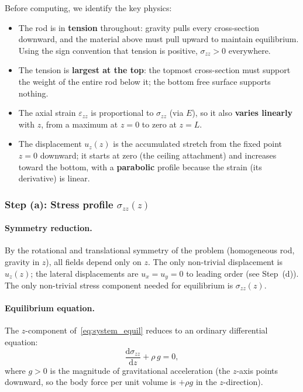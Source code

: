 Before computing, we identify the key physics:

\begin{itemize}
    \item The rod is in \textbf{tension} throughout: gravity pulls every cross-section downward, and the material above must pull upward to maintain equilibrium. Using the sign convention that tension is positive, $\sigma_{zz} > 0$ everywhere.
    \item The tension is \textbf{largest at the top}: the topmost cross-section must support the weight of the entire rod below it; the bottom free surface supports nothing.
    \item The axial strain $\varepsilon_{zz}$ is proportional to $\sigma_{zz}$ (via $E$), so it also \textbf{varies linearly} with $z$, from a maximum at $z=0$ to zero at $z=L$.
    \item The displacement $u_z(z)$ is the accumulated stretch from the fixed point $z=0$ downward; it starts at zero (the ceiling attachment) and increases toward the bottom, with a \textbf{parabolic} profile because the strain (its derivative) is linear.
\end{itemize}

\subsubsection*{Step (a): Stress profile $\sigma_{zz}(z)$}

\paragraph{Symmetry reduction.}
By the rotational and translational symmetry of the problem (homogeneous rod, gravity in $z$), all fields depend only on $z$. The only non-trivial displacement is $u_z(z)$; the lateral displacements are $u_x = u_y = 0$ to leading order (see Step~(d)). The only non-trivial stress component needed for equilibrium is $\sigma_{zz}(z)$.

\paragraph{Equilibrium equation.}
The $z$-component of~\eqref{eq:system_equil} reduces to an ordinary differential equation:
\begin{equation}
    \frac{\mathrm{d}\sigma_{zz}}{\mathrm{d}z} + \rho\, g = 0,
    \label{eq:rod_equil}
\end{equation}
where $g>0$ is the magnitude of gravitational acceleration (the $z$-axis points downward, so the body force per unit volume is $+\rho g$ in the $z$-direction).

